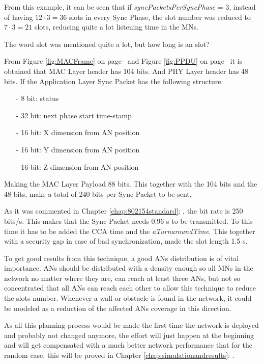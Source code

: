 From this example, it can be seen that if \textit{syncPacketsPerSyncPhase} = 3, instead of having $12 \cdot 3 = 36$ slots in every Sync Phase, the slot 
number was reduced to $7 \cdot 3 = 21$ slots, reducing quite a lot listening time in the \acp{MN}.

The word slot was mentioned quite a lot, but how long is an slot?

From Figure \ref{fig:MACFrame} on page~\pageref{fig:MACFrame} and Figure \ref{fig:PPDU} on page~\pageref{fig:PPDU} it is obtained that \ac{MAC}
Layer header has 104 bits. And \ac{PHY} Layer header has 48 bits. If the Application Layer Sync Packet has the following structure:
\begin{itemize}
 \item[-] 8 bit: status
 \item[-] 32 bit: next phase start time-stamp
 \item[-] 16 bit: X dimension from \ac{AN} position
 \item[-] 16 bit: Y dimension from \ac{AN} position
 \item[-] 16 bit: Z dimension from \ac{AN} position
\end{itemize}
Making the \ac{MAC} Layer Payload 88 bits. This together with the 104 bits and the 48 bits, make a total of 240 bits per Sync Packet to be sent.

As it was commented in Chapter \ref{chap:802154standard}: , the bit rate is 250 bits/s. This makes that the Sync
Packet needs 0.96 s to be transmitted. To this time it has to be added the \ac{CCA} time and the \textit{aTurnaroundTime}. This together with
a security gap in case of bad synchronization, made the slot length 1.5 s.

To get good results from this technique, a good \acp{AN} distribution is of vital importance. \acp{AN} should be distributed with a density enough
so all \acp{MN} in the network no matter where they are, can reach at least three \acp{AN}, but not so concentrated that all \acp{AN} can
reach each other to allow this technique to reduce the slots number. Whenever a wall or obstacle is found in the network, it could be modeled as
a reduction of the affected \acp{AN} coverage in this direction. 

As all this planning process would be made the first time the network is deployed and probably not changed anymore, the effort will just happen 
at the beginning and will get compensated with a much better network performance that for the random case, this will be proved in Chapter 
\ref{chap:simulationandresults}: .